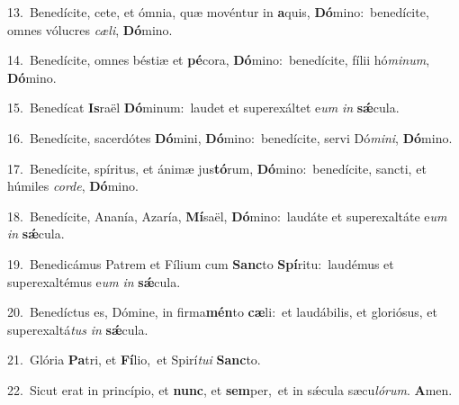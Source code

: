 {\numbfont\textcolor{\numbcolor}{13.}}~Benedícite, cete, et ómnia, quæ movéntur in \textbf{a}\-quis, \textbf{Dó}\-mino:~\star benedícite, omnes vólucres \textit{cæ}\-\textit{li}, \textbf{Dó}\-mino.\par
{\numbfont\textcolor{\numbcolor}{14.}}~Benedícite, omnes béstiæ et \textbf{pé}\-cora, \textbf{Dó}\-mino:~\star benedícite, fílii hó\-\textit{mi}\-\textit{num}, \textbf{Dó}\-mino.\par
{\numbfont\textcolor{\numbcolor}{15.}}~Benedícat \textbf{Is}\-raël \textbf{Dó}\-minum:~\star laudet et superexáltet e\textit{um} \textit{in} \textbf{sǽ}\-cula.\par
{\numbfont\textcolor{\numbcolor}{16.}}~Benedícite, sacerdótes \textbf{Dó}\-mini, \textbf{Dó}\-mino:~\star benedícite, servi Dó\-\textit{mi}\-\textit{ni}, \textbf{Dó}\-mino.\par
{\numbfont\textcolor{\numbcolor}{17.}}~Benedícite, spíritus, et ánimæ jus\-\textbf{tó}\-rum, \textbf{Dó}\-mino:~\star benedícite, sancti, et húmiles \textit{cor}\-\textit{de}, \textbf{Dó}\-mino.\par
{\numbfont\textcolor{\numbcolor}{18.}}~Benedícite, Ananía, Azaría, \textbf{Mí}\-saël, \textbf{Dó}\-mino:~\star laudáte et superexaltáte e\textit{um} \textit{in} \textbf{sǽ}\-cula.\par
{\numbfont\textcolor{\numbcolor}{19.}}~Benedicámus Patrem et Fílium cum \textbf{Sanc}\-to \textbf{Spí}\-ritu:~\star laudémus et superexaltémus e\textit{um} \textit{in} \textbf{sǽ}\-cula.\par
{\numbfont\textcolor{\numbcolor}{20.}}~Benedíctus es, Dómine, in firma\-\textbf{mén}\-to \textbf{cæ}\-li:~\star et laudábilis, et gloriósus, et superexaltá\textit{tus} \textit{in} \textbf{sǽ}\-cula.\par
{\numbfont\textcolor{\numbcolor}{21.}}~Glória \textbf{Pa}\-tri, et \textbf{Fí}\-lio,~\star et Spirí\-\textit{tu}\-\textit{i} \textbf{Sanc}\-to.\par
{\numbfont\textcolor{\numbcolor}{22.}}~Sicut erat in princípio, et \textbf{nunc}\-, et \textbf{sem}\-per,~\star et in sǽcula sæcu\-\textit{ló}\-\textit{rum}. \textbf{A}\-men.\par
